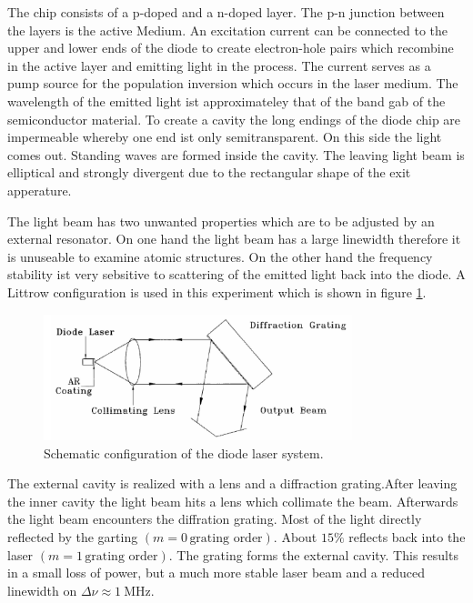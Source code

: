 The chip consists of a p-doped and a n-doped layer. The p-n junction between the layers is the active Medium.
An excitation current can be connected to the upper and lower ends of the diode to create electron-hole pairs which recombine in the active layer and
emitting light in the process. The current serves as a pump source for the population inversion which occurs in the laser medium.
The wavelength of the emitted light ist approximateley that of the band gab of the semiconductor material.
To create a cavity the long endings of the diode chip are impermeable whereby one end ist only semitransparent.
On this side the light comes out.
Standing waves are formed inside the cavity. The leaving light beam is elliptical and strongly divergent due to the  rectangular shape of the
exit apperature.

The light beam has two unwanted properties which are to be adjusted by an external resonator.
On one hand the light beam has a large linewidth therefore it is unuseable to examine atomic structures.
On the other hand the frequency stability ist very sebsitive to scattering of the emitted light back into the diode.
A Littrow configuration is used in this experiment which is shown in figure \ref{fig:configuration}. 

\begin{figure}[H]
    \centering
    \includegraphics[width=0.8\textwidth]{content/graphics/configuration.jpg}
    \caption{Schematic configuration of the diode laser system.} %
    \label{fig:configuration}
\end{figure}

The external cavity is realized with a lens and a diffraction grating.After leaving the inner cavity the light beam hits a lens which collimate the beam.
Afterwards the light beam encounters the diffration grating. Most of the light directly reflected by the garting  $\left(m = 0 \, \text{grating order}\right)$.
About $ 15 \% $ reflects back into the laser $\left(m = 1  \,\text{grating order}\right)$. The grating forms the external cavity.
This results in a small loss of power, but a much more stable laser beam and a reduced linewidth on $\Delta \nu \approx \qty{1}{\mega\hertz}$.


